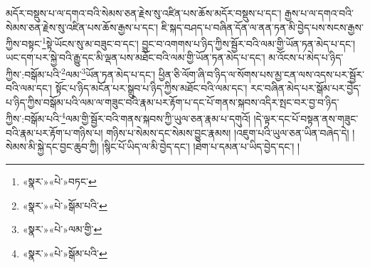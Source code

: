 མདོར་བསྡུས་པ་ལ་དགའ་བའི་སེམས་ཅན་རྗེས་སུ་འཛིན་པས་ཆོས་མདོར་བསྡུས་པ་དང་། རྒྱས་པ་ལ་དགའ་བའི་སེམས་ཅན་རྗེས་སུ་འཛིན་པས་ཆོས་རྒྱས་པ་དང་། ཇི་སྐད་བཤད་པ་བཞིན་དོན་ལ་ནན་ཏན་མི་བྱེད་པས་སངས་རྒྱས་ཀྱིས་བསྟང་\footnote{«སྣར་»«པེ་»བཏང་}སྟེ་ཡོངས་སུ་མ་བཟུང་བ་དང་། བྱུང་བ་འགགས་པ་ཉིད་ཀྱིས་སྦྱོར་བའི་ལམ་གྱི་ཡོན་ཏན་མེད་པ་དང་། ཡང་དག་པར་སྐྱེ་བའི་རྒྱུ་དང་མི་ལྡན་པས་མཐོང་བའི་ལམ་གྱི་ཡོན་ཏན་མེད་པ་དང་། མ་འོངས་པ་མེད་པ་ཉིད་ཀྱིས་:བསྒོམ་པའི་\footnote{«སྣར་»«པེ་»སྒོམ་པའི་}ལམ་\footnote{«སྣར་»«པེ་»ལམ་གྱི་}ཡོན་ཏན་མེད་པ་དང་། ཕྱིན་ཅི་ལོག་ཞི་བ་ཉིད་ལ་སོགས་པས་མྱ་ངན་ལས་འདས་པར་སྦྱོར་བའི་ལམ་དང་། སྟོང་པ་ཉིད་མངོན་པར་སྒྲུབ་པ་ཉིད་ཀྱིས་མཐོང་བའི་ལམ་དང་། རང་བཞིན་མེད་པར་སྒོམ་པར་བྱེད་པ་ཉིད་ཀྱིས་བསྒོམ་པའི་ལམ་ལ་གཟུང་བའི་རྣམ་པར་རྟོག་པ་དང་པོ་གནས་སྐབས་འདིར་སྤང་བར་བྱ་བ་ཉིད་ཀྱིས་:བསྒོམ་པའི་\footnote{«སྣར་»«པེ་»སྒོམ་པའི་}ལམ་གྱི་སྦྱོར་བའི་གནས་སྐབས་ཀྱི་ཡུལ་ཅན་རྣམ་པ་དགུའོ། །དེ་ལྟར་དང་པོ་བསྟན་ནས་གཟུང་བའི་རྣམ་པར་རྟོག་པ་གཉིས་པ། གཉིས་པ་སེམས་དང་སེམས་བྱུང་རྣམས། །འཇུག་པའི་ཡུལ་ཅན་ཡིན་བཞེད་དེ། །སེམས་མི་སྐྱེ་དང་བྱང་ཆུབ་ཀྱི། །སྙིང་པོ་ཡིད་ལ་མི་བྱེད་དང་། །ཐེག་པ་དམན་པ་ཡིད་བྱེད་དང་། །
